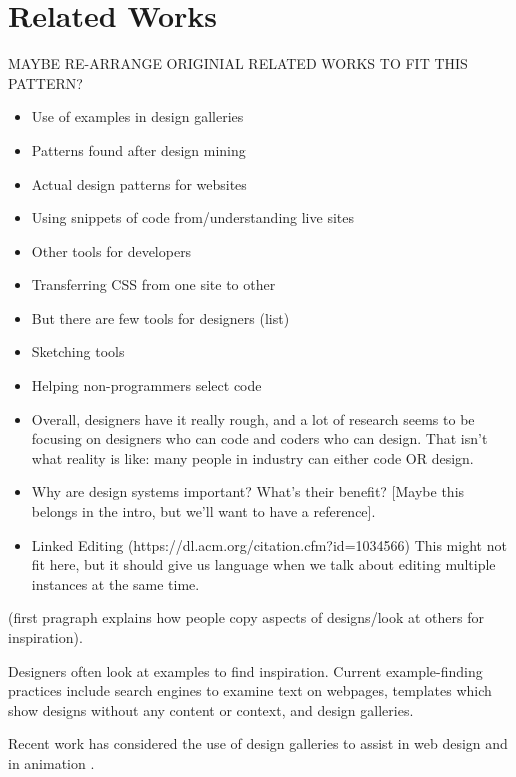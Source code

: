 \documentclass{sigchi}
\begin{document}
\section{Related Works}
MAYBE RE-ARRANGE ORIGINIAL RELATED WORKS TO FIT THIS PATTERN? 
\begin{itemize}
    \item Use of examples in design galleries
    \item Patterns found after design mining
    \item Actual design patterns for websites
    \item Using snippets of code from/understanding live sites
    \item Other tools for developers
    \item Transferring CSS from one site to other
    \item But there are few tools for designers (list)
    \item Sketching tools \cite{retrieving_websites_with_sketches_example_based_design_hashimoto_igarashi_EUROGRAPHICS_EWSBIM_2005}
    \item Helping non-programmers select code \cite{dinah_non_programmers_coding_Gross_CHI_2011}
    \item Overall, designers have it really rough, and a lot of research seems to be focusing on designers who can code and coders who can design. That isn’t what reality is like: many people in industry can either code OR design. 
    \item Why are design systems important? What’s their benefit? [Maybe this belongs in the intro, but we’ll want to have a reference].
    \item Linked Editing (https://dl.acm.org/citation.cfm?id=1034566) This might not fit here, but it should give us language when we talk about editing multiple instances at the same time.
\end{itemize}


(first pragraph explains how people copy aspects of designs/look at others for inspiration). 

Designers often look at examples to find inspiration. Current example-finding practices include search engines to examine text on webpages, templates which show designs without any content or context, and design galleries. 

Recent work has considered the use of design galleries to assist in web design \cite{dtour_Ritchie_UIST_2011, interactive_example_galleries_Lee_CHI_2010} and in animation \cite{designGalleries_mitsubishi_Marks_SIGGRAPH_1997}. 
\end{document}
